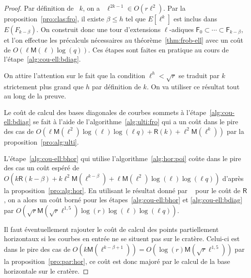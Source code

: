 \documentclass[10pt,a4paper]{book}
\theoremstyle{plain}
\theoremstyle{definition}
\theoremstyle{definition}
\theoremstyle{definition}
\theoremstyle{definition}
\theoremstyle{remark}
\theoremstyle{remark}
\theoremstyle{definition}
\begin{document}
\begin{proof}
Par définition de ~$k$, on a ~$\ell^{2k-1} \in O(r\ell^2)$.
  Par la proposition~\ref{pro:clas:fro}, il existe $\beta \leqslant h$ tel que
  $E[\ell^k]$ est inclus dans $E(F_{k-\beta})$. On construit donc une
  tour d'extensions $\ell$-adiques $\mathsf{F}_0\subset\cdots\subset 
  \mathsf{F}_{k-\beta}$, et l'on effectue les précalculs nécessaires au 
  théorème~\ref{thm:frob-ell} avec un coût de 
  $O(\ell\mathsf{M}(\ell)\log(q))$. Ces étapes sont faites en pratique au cours
  de l'étape~\ref{alg:cou-ell:bdiag}.
  
  On attire l'attention sur le fait que la condition $\ell^h<\sqrt{r}$ se traduit par 
  $k$ strictement plus grand que $h$ par définition de $k$.
  On va utiliser ce résultat tout au long de la preuve. 
 
  Le coût de calcul des bases diagonales de courbes sommets à 
  l'étape~\ref{alg:cou-ell:bdiag} se fait à l'aide de 
  l'algorithme~\ref{alg:ulti:fro} qui a un coût dans le pire des cas
  de 
  $O(\ell\mathsf{M}(\ell^2)\log(\ell)\log(\ell q)+\mathsf{R}(k) +  \ell^2\mathsf{M}(\ell^{k}))$ 
  par la proposition~\ref{pro:alg:ulti}. %

  L'étape~\ref{alg:cou-ell:bhor} qui utilise 
  l'algorithme~\ref{alg:hor:poi} coûte dans le pire des cas un coût espéré de
  $O(k\mathsf{R}(k-\beta) + k\ell^2\mathsf{M}(\ell^{k-\beta}) + \ell\mathsf{M}(\ell^2)\log(\ell)\log(\ell q))$ d'après la 
  proposition~\ref{pro:alg:hor}.
  En utilisant le  résultat  donné par ~\cite[Chapter~14.5]{vzGJG03} pour le 
  coût de $\mathsf{R}$, on a alors un coût borné pour les 
  étapes~\ref{alg:cou-ell:bhor} et \ref{alg:cou-ell:bdiag} par 
  $O(\sqrt{r}\mathsf{M}(\sqrt{r}\ell^{1,5})\log(r)\log(\ell)\log(\ell q))$.
  
  Il faut éventuellement rajouter le coût de calcul des points partiellement 
  horizontaux si les courbes en entrée ne se situent pas sur le cratère. 
  Celui-ci est dans le pire des cas de
  $O(k\mathsf{M}(\ell^{k-\beta+1})) = O(\log(r) \mathsf{M}(\sqrt{r} \ell^{1,5}) )$ par la proposition~\ref{pro:par:hor}, ce 
  coût est donc majoré par le calcul de la base horizontale sur le cratère.


\end{proof}
\end{document}
